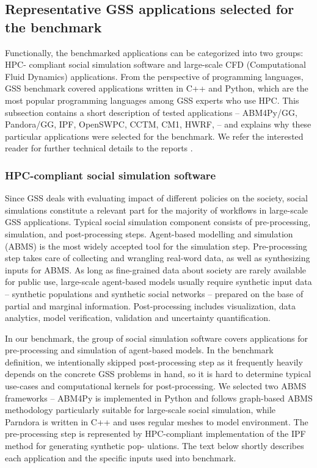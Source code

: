 \subsection{Representative GSS applications selected for the benchmark}

Functionally, the benchmarked applications can be categorized into two groups: HPC-
compliant social simulation software and large-scale CFD (Computational Fluid Dynamics)
applications. From the perspective of programming languages, GSS benchmark covered applications written in C++ and Python, which are the most popular programming languages among GSS experts who use HPC. This subsection contains a short description of tested applications -- ABM4Py/GG, Pandora/GG, IPF, OpenSWPC, CCTM, CM1, HWRF, -- and explains why these particular applications were selected for the benchmark.
We refer the interested reader for further technical details to the reports \cite{2017:coegss_benchmark1,2018:coegss_benchmark2}.

\subsubsection{HPC-compliant social simulation software}

Since GSS deals with evaluating impact of different policies on the society, social simulations
constitute a relevant part for the majority of workflows in large-scale GSS applications. Typical
social simulation component consists of pre-processing, simulation, and post-processing steps.
Agent-based modelling and simulation (ABMS) is the most widely accepted tool for the simulation step.
Pre-processing step takes care of collecting and wrangling real-word data, as well as
synthesizing inputs for ABMS. As long as fine-grained data about society are rarely available
for public use, large-scale agent-based models usually require synthetic input data -- synthetic
populations and synthetic social networks -- prepared on the base of partial and marginal information.
Post-processing includes visualization, data analytics, model verification, validation
and uncertainty quantification.

In our benchmark, the group of social simulation software covers applications for pre-processing
and simulation of agent-based models. In the benchmark definition, we intentionally
skipped post-processing step as it frequently heavily depends on the concrete GSS problems in
hand, so it is hard to determine typical use-cases and computational kernels for post-processing.
We selected two ABMS frameworks -- \textsf{ABM4Py} is implemented in Python and follows
graph-based ABMS methodology particularly suitable for large-scale social simulation, while \textsf{Parndora}
is written in C++ and uses regular meshes to model environment. The pre-processing step is
represented by HPC-compliant implementation of the IPF method for generating synthetic pop-
ulations. The text below shortly describes each application and the specific inputs used into
benchmark.

